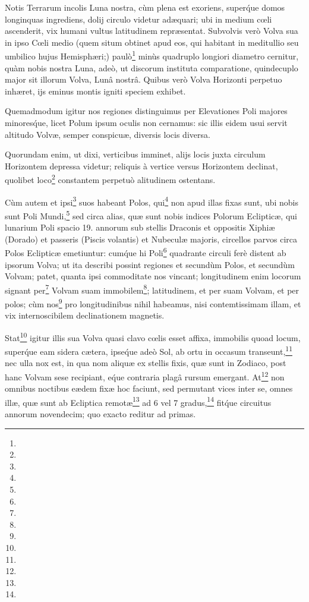 \documentclass[a4paper, 11pt, oneside, polutonikogreek, german]{article}
\begin{document}
Notis Terrarum incolis Luna nostra, cùm plena est exoriens, super\'que domos longinquas ingrediens, dolij circulo videtur adæquari; ubi in medium cœli ascenderit, vix humani vultus latitudinem repræsentat. Subvolvis verò Volva sua in ipso Cœli medio (quem situm obtinet apud eos, qui habitant in meditullio seu umbilico hujus Hemisphæri;) paulò\footnote{} minùs quadruplo longiori diametro cernitur, quàm nobis nostra Luna, adeò, ut discorum instituta comparatione, quindecuplo major sit illorum Volva, Lunâ nostrâ. Quibus verò Volva Horizonti perpetuo inhæret, ijs eminus montis igniti speciem exhibet.

Quemadmodum igitur nos regiones distinguimus per Elevationes Poli majores minores\'que, licet Polum ipsum oculis non cernamus: sic illis eidem usui servit altitudo Volvæ, semper conspicuæ, diversis locis diversa.

Quorundam enim, ut dixi, verticibus imminet, alijs locis juxta circulum Horizontem depressa videtur; reliquis à vertice versus Horizontem declinat, quolibet loco\footnote{} constantem perpetuò alitudinem ostentans.

Cùm autem et ipsi\footnote{} suos habeant Polos, qui\footnote{} non apud illas fixas sunt, ubi nobis sunt Poli Mundi,\footnote{} sed circa alias, quæ sunt nobis indices Polorum Eclipticæ, qui lunarium Poli spacio 19. annorum sub stellis Draconis et oppositis Xiphiæ (Dorado) et passeris (Piscis volantis) et Nubeculæ majoris, circellos parvos circa Polos Eclipticæ emetiuntur: cum\'que hi Poli\footnote{} quadrante circuli ferè distent ab ipsorum Volva; ut ita describi possint regiones et secundùm Polos, et secundùm Volvam; patet, quanta ipsi commoditate nos vincant; longitudinem enim locorum signant per\footnote{} Volvam suam immobilem\footnote{}; latitudinem, et per suam Volvam, et per polos; cùm nos\footnote{} pro longitudinibus nihil habeamus, nisi contemtissimam illam, et vix internoscibilem declinationem magnetis.

Stat\footnote{} igitur illis sua Volva quasi clavo cœlis esset affixa, immobilis quoad locum, super\'que eam sidera cætera, ipse\'que adeò Sol, ab ortu in occasum transeunt,\footnote{} nec ulla nox est, in qua nom aliquæ ex stellis fixis, quæ sunt in Zodiaco, post hanc Volvam sese recipiant, e\'que contraria plagâ rursum emergant. At\footnote{} non omnibus noctibus eædem fixæ hoc faciunt, sed permutant vices inter se, omnes illæ, quæ sunt ab Ecliptica remotæ\footnote{} ad 6 vel 7 gradus,\footnote{} fit\'que circuitus annorum novendecim; quo exacto reditur ad primas.
\end{document}
